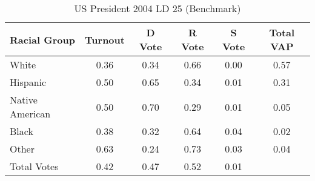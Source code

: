 \begin{table}[htb]
\begin{center}
\caption{US President 2004 LD 25 (Benchmark)}
\label{pres04_vap_ld_25_benchmark}
\begin{tabular}{lccccc}
  \hline
Racial Group & Turnout & D Vote & R Vote & S Vote & Total VAP \\ 
  \hline
White & 0.36 & 0.34 & 0.66 & 0.00 & 0.57 \\ 
  Hispanic & 0.50 & 0.65 & 0.34 & 0.01 & 0.31 \\ 
  Native American & 0.50 & 0.70 & 0.29 & 0.01 & 0.05 \\ 
  Black & 0.38 & 0.32 & 0.64 & 0.04 & 0.02 \\ 
  Other & 0.63 & 0.24 & 0.73 & 0.03 & 0.04 \\ 
  Total Votes & 0.42 & 0.47 & 0.52 & 0.01 &  \\ 
   \hline
\end{tabular}
\end{center}
\end{table}
